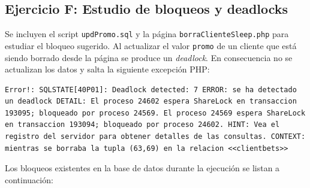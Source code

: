 \documentclass{article}
\begin{document}
\subsection{Ejercicio F: {\small Estudio de bloqueos y deadlocks}}
Se incluyen el script \texttt{updPromo.sql} y la página \texttt{borraClienteSleep.php} para estudiar el bloqueo sugerido. Al actualizar el valor \texttt{promo} de un cliente que está siendo borrado desde la página se produce un \textit{deadlock}. En consecuencia no se actualizan los datos y salta la siguiente excepción PHP:
\begin{lstlisting}
Error!: SQLSTATE[40P01]: Deadlock detected: 7 ERROR: se ha detectado un deadlock DETAIL: El proceso 24602 espera ShareLock en transaccion 193095; bloqueado por proceso 24569. El proceso 24569 espera ShareLock en transaccion 193094; bloqueado por proceso 24602. HINT: Vea el registro del servidor para obtener detalles de las consultas. CONTEXT: mientras se borraba la tupla (63,69) en la relacion <<clientbets>>
\end{lstlisting}
Los bloqueos existentes en la base de datos durante la ejecución se listan a continuación:
\end{document}
